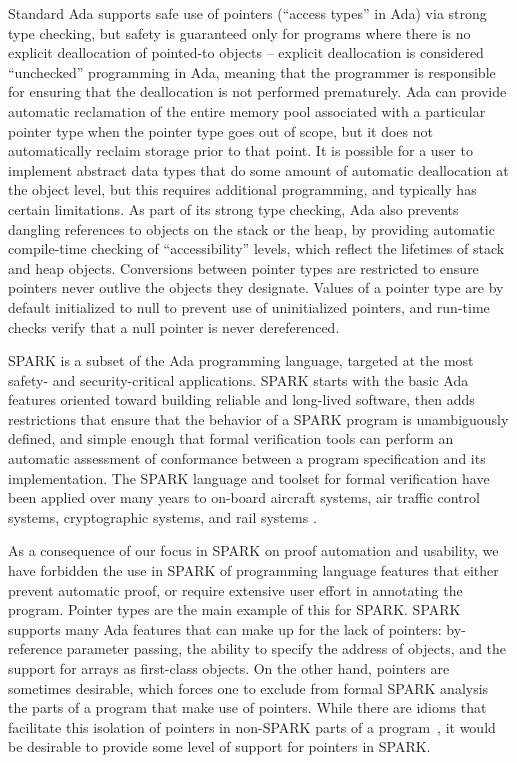 \documentclass{llncs}
\begin{document}
Standard Ada supports safe use of pointers (``access types'' in Ada) via strong type checking, but safety is guaranteed only for programs where there is no explicit deallocation of pointed-to objects -- explicit deallocation is considered ``unchecked'' programming in Ada, meaning that the programmer is responsible for ensuring that the deallocation is not performed prematurely. Ada can provide automatic reclamation of the entire memory pool associated with a particular pointer type when the pointer type goes out of scope, but it does not automatically reclaim storage prior to that point. It is possible for a user to implement abstract data types that do some amount of automatic deallocation at the object level, but this requires additional programming, and typically has certain limitations. As part of its strong type checking, Ada also prevents dangling references to objects on the stack or the heap, by providing automatic compile-time checking of ``accessibility'' levels, which reflect the lifetimes of stack and heap objects.  Conversions between pointer types are restricted to ensure pointers never outlive the objects they designate. Values of a pointer type are by default initialized to null to prevent use of uninitialized pointers, and run-time checks verify that a null pointer is never dereferenced.


SPARK is a subset of the Ada programming language, targeted at the most safety- and security-critical applications. SPARK starts with the basic Ada features oriented toward building reliable and long-lived software, then adds restrictions that ensure that the behavior of a SPARK program is unambiguously defined, and simple enough that formal verification tools can perform an automatic assessment of conformance between a program specification and its implementation. The SPARK language and toolset for formal verification have been applied over many years to on-board aircraft systems,
air traffic control systems, cryptographic systems, and rail systems \cite{ONeill2012, McCormick2015}.

As a consequence of our focus in SPARK on proof automation and usability, we have forbidden the use in SPARK of programming language features that either prevent automatic proof, or require extensive user effort in annotating the program. Pointer types are the main example of this for SPARK. SPARK supports many Ada features that can make up for the lack of pointers: by-reference parameter passing, the ability to specify the address of objects, and the support for arrays as first-class objects. On the other hand, pointers are sometimes desirable, which forces one to exclude from formal SPARK analysis the parts of a program that make use of pointers. While there are idioms that facilitate this isolation of pointers in non-SPARK parts of a program~\cite{AdaCoreThalesSPARK}, it would be desirable to provide some level of support for pointers in SPARK.
\end{document}
